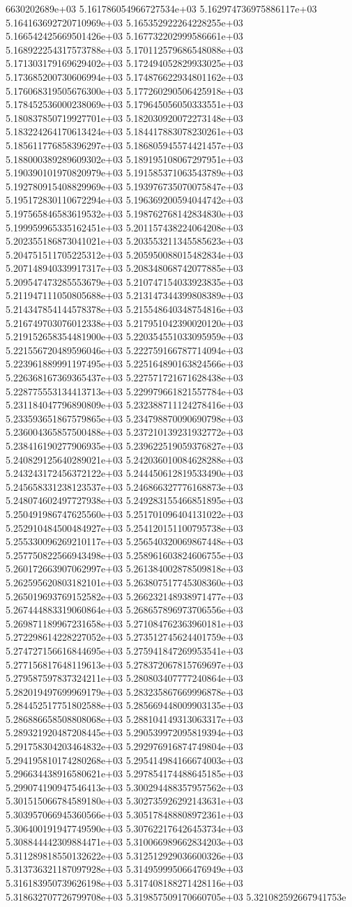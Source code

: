 6630202689e+03	5.161786054966727534e+03	5.162974736975886117e+03	5.164163692720710969e+03	5.165352922264228255e+03	5.166542425669501426e+03	5.167732202999586661e+03	5.168922254317573788e+03	5.170112579686548088e+03	5.171303179169629402e+03	5.172494052829933025e+03	5.173685200730606994e+03	5.174876622934801162e+03	5.176068319505676300e+03	5.177260290506425918e+03	5.178452536000238069e+03	5.179645056050333551e+03	5.180837850719927701e+03	5.182030920072273148e+03	5.183224264170613424e+03	5.184417883078230261e+03	5.185611776858396297e+03	5.186805945574421457e+03	5.188000389289609302e+03	5.189195108067297951e+03	5.190390101970820979e+03	5.191585371063543789e+03	5.192780915408829969e+03	5.193976735070075847e+03	5.195172830110672294e+03	5.196369200594044742e+03	5.197565846583619532e+03	5.198762768142834830e+03	5.199959965335162451e+03	5.201157438224064208e+03	5.202355186873041021e+03	5.203553211345585623e+03	5.204751511705225312e+03	5.205950088015482834e+03	5.207148940339917317e+03	5.208348068742077885e+03	5.209547473285553679e+03	5.210747154033923835e+03	5.211947111050805688e+03	5.213147344399808389e+03	5.214347854144578378e+03	5.215548640348754816e+03	5.216749703076012338e+03	5.217951042390020120e+03	5.219152658354481900e+03	5.220354551033095959e+03	5.221556720489596046e+03	5.222759166787714094e+03	5.223961889991197495e+03	5.225164890163824566e+03	5.226368167369365437e+03	5.227571721671628438e+03	5.228775553134413713e+03	5.229979661821557784e+03	5.231184047796890809e+03	5.232388711124278416e+03	5.233593651867579865e+03	5.234798870090690798e+03	5.236004365857500488e+03	5.237210139231932772e+03	5.238416190277906935e+03	5.239622519059376827e+03	5.240829125640289021e+03	5.242036010084628288e+03	5.243243172456372122e+03	5.244450612819533490e+03	5.245658331238123537e+03	5.246866327776168873e+03	5.248074602497727938e+03	5.249283155466851895e+03	5.250491986747625560e+03	5.251701096404131022e+03	5.252910484500484927e+03	5.254120151100795738e+03	5.255330096269210117e+03	5.256540320069867448e+03	5.257750822566943498e+03	5.258961603824606755e+03	5.260172663907062997e+03	5.261384002878509818e+03	5.262595620803182101e+03	5.263807517745308360e+03	5.265019693769152582e+03	5.266232148938971477e+03	5.267444883319060864e+03	5.268657896973706556e+03	5.269871189967231658e+03	5.271084762363960181e+03	5.272298614228227052e+03	5.273512745624401759e+03	5.274727156616844695e+03	5.275941847269953541e+03	5.277156817648119613e+03	5.278372067815769697e+03	5.279587597837324211e+03	5.280803407777240864e+03	5.282019497699969179e+03	5.283235867669996878e+03	5.284452517751802588e+03	5.285669448009903135e+03	5.286886658508808068e+03	5.288104149313063317e+03	5.289321920487208445e+03	5.290539972095819394e+03	5.291758304203464832e+03	5.292976916874749804e+03	5.294195810174280268e+03	5.295414984166674003e+03	5.296634438916580621e+03	5.297854174488645185e+03	5.299074190947546413e+03	5.300294488357957562e+03	5.301515066784589180e+03	5.302735926292143631e+03	5.303957066945360566e+03	5.305178488808972361e+03	5.306400191947749590e+03	5.307622176426453734e+03	5.308844442309884471e+03	5.310066989662834203e+03	5.311289818550132622e+03	5.312512929036600326e+03	5.313736321187097928e+03	5.314959995066476949e+03	5.316183950739626198e+03	5.317408188271428116e+03	5.318632707726799708e+03	5.319857509170660705e+03	5.321082592667941753e